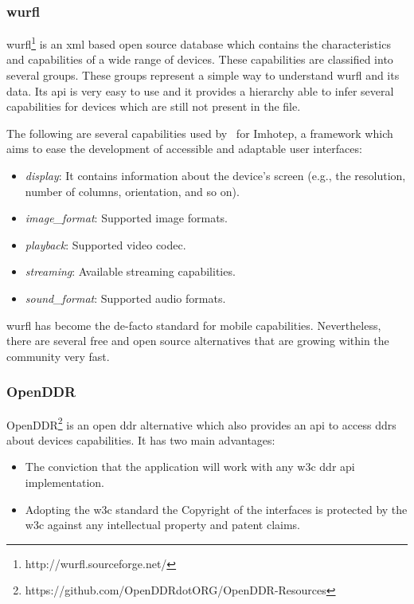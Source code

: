 \subsubsection{\ac{wurfl}} 

\ac{wurfl}\footnote{http://wurfl.sourceforge.net/} is an \ac{xml} based
open source database which contains the characteristics and capabilities of a 
wide range of devices. These capabilities are classified into several groups. 
These groups represent a simple way to understand \ac{wurfl} and its data. Its 
\ac{api} is very easy to use and it provides a hierarchy able to infer several 
capabilities for devices which are still not present in the file.

The following are several capabilities used by~\citet{almeida_imhotep_2011} for
Imhotep, a framework which aims to ease the development of accessible and adaptable
user interfaces:

\begin{itemize}
 \item \textit{display}: It contains information about the device's screen (e.g.,
 the resolution, number of columns, orientation, and so on).
 \item \textit{image\_format}: Supported image formats.
 \item \textit{playback}: Supported video codec.
 \item \textit{streaming}: Available streaming capabilities.
 \item \textit{sound\_format}: Supported audio formats.
\end{itemize}

\ac{wurfl} has become the de-facto standard for mobile capabilities. Nevertheless,
there are several free and open source alternatives that are growing within the
community very fast.

\subsubsection{OpenDDR}

OpenDDR\footnote{https://github.com/OpenDDRdotORG/OpenDDR-Resources} is an open 
\ac{ddr} alternative which also provides an \ac{api} to access \ac{ddr}s about 
devices capabilities. It has two main advantages:

\begin{itemize}
 \item The conviction that the application will work with any \ac{w3c} \ac{ddr} 
 \ac{api} implementation.
 \item Adopting the \ac{w3c} standard the Copyright of the interfaces is 
 protected by the \ac{w3c} against any intellectual property and patent claims.
\end{itemize}


